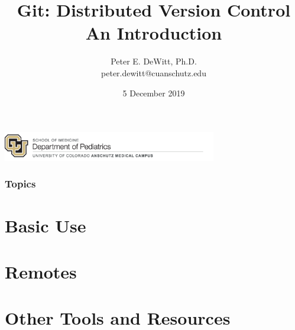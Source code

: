 \documentclass{beamer}
\author[Peter E. DeWitt]{Peter E. DeWitt, Ph.D.\inst{1} \\ peter.dewitt@cuanschutz.edu}
\institute[]{SOM | Department of Pediatrics | Informatics and Data Science}
\title[Intro to Git]{Git: Distributed Version Control \\ {\small An Introduction}}
\date{5 December 2019}
\begin{document}
  \begin{frame}[t,plain]
    \titlepage
    \includegraphics[width=0.7\textwidth]{som_pediatrics}
  \end{frame}

  \begin{frame}[t]
    \frametitle{Topics}
    \tableofcontents[hideallsubsections]
  \end{frame}

 
 

 \section{Basic Use}
  \begin{frame}
    \frametitle{}
  \end{frame}

 \section{Remotes}
  \begin{frame}
    \frametitle{}
  \end{frame}

 \section{Other Tools and Resources}
  \begin{frame}
    \frametitle{}
  \end{frame}
\end{document}
